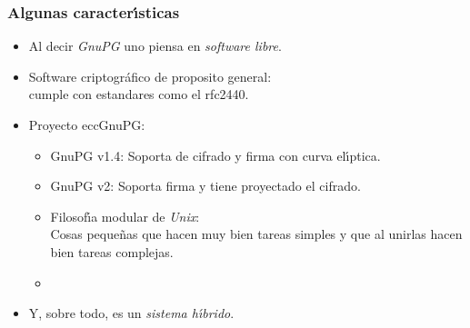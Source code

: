 \documentclass{beamer}
\def\ce{curva{} el\'{\i}ptica}%
\theoremstyle{plain}        			%
\theoremstyle{definition}   			%
\theoremstyle{saltolinea}   			%
\begin{document}
\begin{frame}
\frametitle{Algunas caracter\'{\i}sticas}
	\pause
	  \begin{itemize}[<+-| alert@+>]
		\item Al decir \emph{GnuPG} uno piensa en \emph{software libre}.
		\item Software criptogr\'afico de proposito general: \\cumple con estandares como el rfc2440.
		\item Proyecto eccGnuPG: 
		\begin{itemize}[<+-| alert@+>]
			\item GnuPG v1.4: Soporta de cifrado y firma con {\ce}.
			\item GnuPG v2: Soporta firma y tiene proyectado el cifrado.
			\item[] Filosof\'{\i}a modular de \emph{Unix}:\\Cosas peque\~nas que hacen muy bien tareas simples y que al unirlas hacen bien tareas complejas.
			\item {\begin{center}\end{center}}
		\end{itemize}
		\item Y, sobre todo, es un \emph{sistema h\'{\i}brido}.
	  \end{itemize}
\end{frame}
\end{document}
